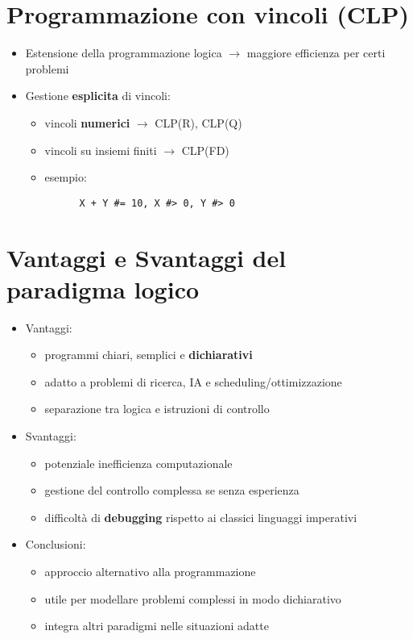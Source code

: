 \documentclass[12pt]{extarticle}
\begin{document}
\newpage

\section*{Programmazione con vincoli (CLP)}
\begin{itemize}
  \item Estensione della programmazione logica $\rightarrow$ maggiore efficienza per certi problemi
  \item Gestione \textbf{esplicita} di vincoli:
  \begin{itemize}
    \item vincoli \textbf{numerici} $\rightarrow$ CLP(R), CLP(Q)
    \item vincoli su insiemi finiti $\rightarrow$ CLP(FD)
    \item esempio:
    \begin{lstlisting}
      X + Y #= 10, X #> 0, Y #> 0
    \end{lstlisting}
  \end{itemize}
\end{itemize}

\section*{Vantaggi e Svantaggi del paradigma logico}
\begin{itemize}
  \item Vantaggi:
  \begin{itemize}
    \item programmi chiari, semplici e \textbf{dichiarativi}
    \item adatto a problemi di ricerca, IA e scheduling/ottimizzazione
    \item separazione tra logica e istruzioni di controllo
  \end{itemize}
  \item Svantaggi:
  \begin{itemize}
    \item potenziale inefficienza computazionale
    \item gestione del controllo complessa se senza esperienza
    \item difficoltà di \textbf{debugging} rispetto ai classici linguaggi imperativi
  \end{itemize}
  \item Conclusioni:
  \begin{itemize}
    \item approccio alternativo alla programmazione 
    \item utile per modellare problemi complessi in modo dichiarativo
    \item integra altri paradigmi nelle situazioni adatte
  \end{itemize}
\end{itemize}
\end{document}
